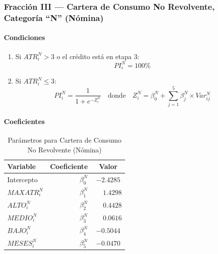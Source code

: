 \subsubsection{Fracción III --- Cartera de Consumo No Revolvente, Categoría ``N'' (Nómina)}

\paragraph*{Condiciones}

\begin{enumerate}[label=\alph*)]
    \item Si $ATR_i^N > 3$ o el crédito está en etapa 3:
        \begin{equation}
            PI_i^N = 100\%
        \end{equation}
    \item Si $ATR_i^N \leq 3$:
        \begin{equation}
            PI_i^N = \frac{1}{1 + e^{-Z_i^N}} \quad \text{donde} \quad Z_i^N = \beta_0^N + \sum_{j=1}^{5} \beta_j^N \times Var_{ij}^N
        \end{equation}
\end{enumerate}

\paragraph*{Coeficientes}

\begin{table}[h!]
\centering
\small
\begin{tabular}{lrc}
    \toprule
    \textbf{Variable} & \textbf{Coeficiente} & \textbf{Valor} \\
    \midrule
    Intercepto & $\beta_0^N$ & $-2.4285$ \\
    $MAXATR_i^N$ & $\beta_1^N$ & $\phantom{-}1.4298$ \\
    $ALTO_i^N$ & $\beta_2^N$ & $\phantom{-}0.4428$ \\
    $MEDIO_i^N$ & $\beta_3^N$ & $\phantom{-}0.0616$ \\
    $BAJO_i^N$ & $\beta_4^N$ & $-0.5044$ \\
    $MESES_i^N$ & $\beta_5^N$ & $-0.0470$ \\
    \bottomrule
\end{tabular}
\caption{Parámetros para Cartera de Consumo No Revolvente (Nómina)}
\end{table}

